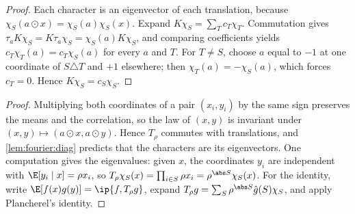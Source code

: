 \begin{refsection}
\begin{proof}
Each character is an eigenvector of each translation, because $\chi_S(a\odot x)=\chi_S(a)\chi_S(x)$. Expand $K\chi_S=\sum_Tc_T\chi_T$. Commutation gives $\tau_aK\chi_S=K\tau_a\chi_S=\chi_S(a)K\chi_S$, and comparing coefficients yields $c_T\chi_T(a)=c_T\chi_S(a)$ for every $a$ and $T$. For $T\ne S$, choose $a$ equal to $-1$ at one coordinate of $S\triangle T$ and $+1$ elsewhere; then $\chi_T(a)=-\chi_S(a)$, which forces $c_T=0$. Hence $K\chi_S=c_S\chi_S$.
\end{proof}



\begin{proof}
Multiplying both coordinates of a pair $(x_i,y_i)$ by the same sign preserves the means and the correlation, so the law of $(x,y)$ is invariant under $(x,y)\mapsto(a\odot x,a\odot y)$. Hence $T_\rho$ commutes with translations, and \cref{lem:fourier:diag} predicts that the characters are its eigenvectors. One computation gives the eigenvalues: given $x$, the coordinates $y_i$ are independent with $\E[y_i\mid x]=\rho x_i$, so $T_\rho\chi_S(x)=\prod_{i\in S}\rho x_i=\rho^{\abs S}\chi_S(x)$. For the identity, write $\E[f(x)g(y)]=\ip{f,T_\rho g}$, expand $T_\rho g=\sum_S\rho^{\abs S}\hat g(S)\chi_S$, and apply Plancherel's identity.
\end{proof}


\end{refsection}
